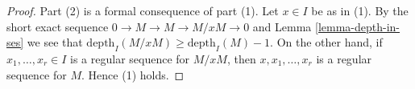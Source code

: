 \documentclass[10pt,a4paper]{amsart}
\theoremstyle{plain}
\theoremstyle{definition}
\theoremstyle{remark}
\numberwithin{equation}{subsection}
\begin{document}
\begin{proof}
Part (2) is a formal consequence of part (1). Let $x \in I$ be as in (1).
By the short exact sequence $0 \to M \to M \to M/xM \to 0$ and
Lemma \ref{lemma-depth-in-ses} we see that
$\text{depth}_I(M/xM) \geq \text{depth}_I(M) - 1$.
On the other hand, if $x_1, \ldots, x_r \in I$
is a regular sequence for $M/xM$, then $x, x_1, \ldots, x_r$
is a regular sequence for $M$. Hence (1) holds.
\end{proof}
\end{document}
